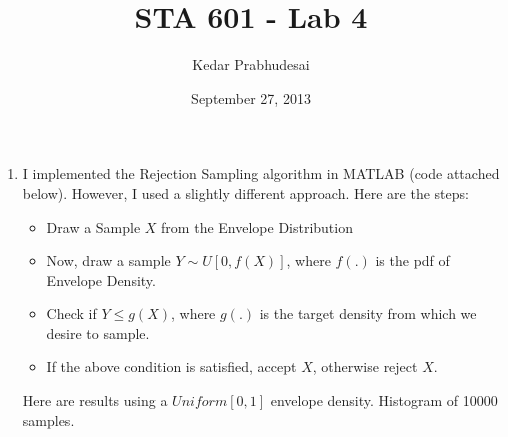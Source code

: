 \documentclass{article}
\title{STA 601 - Lab 4}
\author{Kedar Prabhudesai}
\date{September 27, 2013}
\begin{document}
\maketitle

\begin{enumerate}
\item I implemented the Rejection Sampling algorithm in MATLAB (code attached below). However, I used a slightly different approach. Here are the steps:
\begin{itemize}
\item Draw a Sample $X$ from the Envelope Distribution
\item Now, draw a sample $Y \sim U[0,f(X)]$, where $f(.)$ is the pdf of Envelope Density.
\item Check if $Y \leq g(X)$, where $g(.)$ is the target density from which we desire to sample. 
\item If the above condition is satisfied, accept $X$, otherwise reject $X.$
\end{itemize}

Here are results using a $Uniform[0,1]$ envelope density. Histogram of 10000 samples.\\


\end{enumerate}
\end{document}
